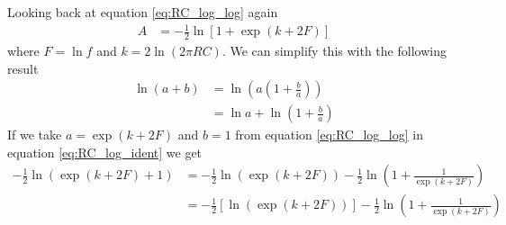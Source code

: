 Looking back at equation \ref{eq:RC_log_log} again
\begin{align}
  A &=-\frac{1}{2}\ln \left[ 1+\exp \left( k + 2F \right) \right] \label{eq:RC_log_log2}
\end{align}
where $F=\ln f$ and $k=2 \ln \left( 2 \pi R C \right)$. We can simplify this with
the following result
\begin{align}
  \ln(a+b) &= \ln\left(a\left(1+\frac{b}{a}\right)\right) \nonumber \\
  &= \ln a + \ln\left(1+\frac{b}{a}\right) \label{eq:RC_log_ident}
\end{align}
If we take $a=\exp \left( k + 2F \right)$ and $b=1$ from equation \ref{eq:RC_log_log} in equation \ref{eq:RC_log_ident} we get
\begin{align}
  -\frac{1}{2}\ln(\exp \left( k + 2F \right)+1) &= -\frac{1}{2}\ln \left(\exp \left( k + 2F \right)\right) -\frac{1}{2}\ln\left(1+\frac{1}{\exp \left( k + 2F \right)}\right) \nonumber \\
  &= -\frac{1}{2}\left[\ln \left(\exp \left( k + 2F \right)\right) \right]-\frac{1}{2}\ln\left(1+\frac{1}{\exp \left( k + 2F \right)}\right)
\end{align}
